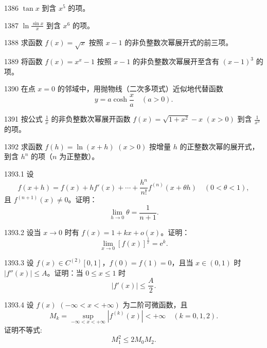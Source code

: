 \begin{prob}[S]{1386}
$\tan x$ 到含 $x^5$ 的项。
\end{prob}

\begin{prob}[S]{1387}
$\ln\frac{\sin x}{x}$ 到含 $x^6$ 的项。
\end{prob}

\begin{prob}[M]{1388}
求函数 $f(x) = \sqrt{x}$ 按照 $x - 1$ 的非负整数次幂展开式的前三项。
\end{prob}

\begin{prob}[M]{1389}
将函数 $f(x) = x^x - 1$ 按照 $x - 1$ 的非负整数次幂展开至含有 $(x - 1)^3$ 的项。
\end{prob}

\begin{prob}[M]{1390}
在点 $x = 0$ 的邻域中，用抛物线（二次多项式）近似地代替函数
\[
y = a\cosh\frac{x}{a} \quad (a > 0).
\]
\end{prob}

\begin{prob}[M]{1391}
按公式 $\frac{1}{x}$ 的非负整数次幂展开函数 $f(x) = \sqrt{1 + x^2} - x$ $(x > 0)$ 到含 $\frac{1}{x^3}$ 的项。
\end{prob}

\begin{prob}[M]{1392}
求函数 $f(h) = \ln(x + h)$ $(x > 0)$ 按增量 $h$ 的正整数次幂的展开式，到含 $h^n$ 的项（$n$ 为正整数）。
\end{prob}

\begin{prob}[M]{1393.1}
设
\[
f(x + h) = f(x) + hf'(x) + \cdots + \frac{h^n}{n!} f^{(n)}(x + \theta h) \quad (0 < \theta < 1),
\]
且 $f^{(n+1)}(x) \neq 0$。证明：
\[
\lim_{h \to 0} \theta = \frac{1}{n + 1}.
\]
\end{prob}

\begin{prob}[M]{1393.2}
设当 $x \to 0$ 时有 $f(x) = 1 + kx + o(x)$。证明：
\[
\lim_{x \to 0} [f(x)]^{\frac{1}{x}} = \mathrm{e}^k.
\]
\end{prob}

\begin{prob}[M]{1393.3}
设 $f(x) \in C^{(2)}[0, 1]$，$f(0) = f(1) = 0$，且当 $x \in (0, 1)$ 时 $|f''(x)| \leqslant A$。证明：当 $0 \leqslant x \leqslant 1$ 时
\[
|f'(x)| \leqslant \frac{A}{2}.
\]
\end{prob}

\begin{prob}[M]{1393.4}
设 $f(x)$ $(-\infty < x < +\infty)$ 为二阶可微函数，且
\[
M_k = \sup_{-\infty < x < +\infty} |f^{(k)}(x)| < +\infty \quad (k = 0, 1, 2).
\]
证明不等式:
\[
M_1^2 \leqslant 2M_0 M_2.
\]
\end{prob}


